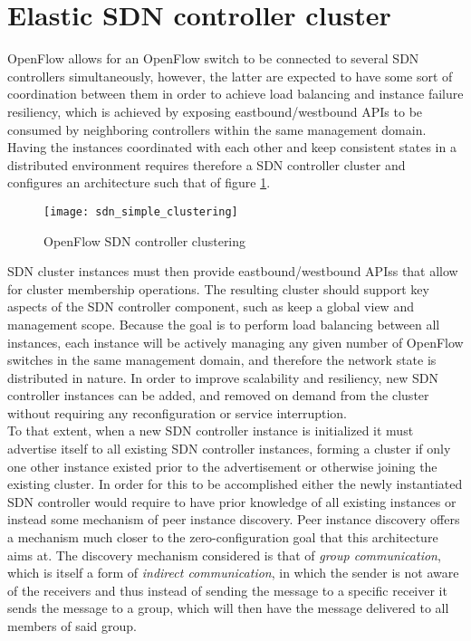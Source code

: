 \section{Elastic SDN controller cluster}
\label{section:SDN-controller-cluster}
OpenFlow allows for an OpenFlow switch to be connected to several \gls{SDN} controllers simultaneously, however, the latter are expected to have some sort of coordination between them in order to achieve load balancing and instance failure resiliency, which is achieved by exposing eastbound/westbound \glspl{API} to be consumed by neighboring controllers within the same management domain.
%
Having the instances coordinated with each other and keep consistent states in a distributed environment requires therefore a \gls{SDN} controller cluster and configures an architecture such that of figure \ref{fig:sdn_simple_clustering}.\\
%
\begin{figure}
	\centering
	\texttt{[image: sdn\_simple\_clustering]}
	\caption{OpenFlow SDN controller clustering}
	\label{fig:sdn_simple_clustering}
\end{figure}
%
\gls{SDN} cluster instances must then provide eastbound/westbound \glspl{API}s that allow for cluster membership operations.
The resulting cluster should support key aspects of the \gls{SDN} controller component, such as keep a global view and management scope.
Because the goal is to perform load balancing between all instances, each instance will be actively managing any given number of OpenFlow switches in the same management domain, and therefore the network state is distributed in nature.
In order to improve scalability and resiliency, new \gls{SDN} controller instances can be added, and removed on demand from the cluster without requiring any reconfiguration or service interruption.\\
%
To that extent, when a new \gls{SDN} controller instance is initialized it must advertise itself to all existing \gls{SDN} controller instances, forming a cluster if only one other instance existed prior to the advertisement or otherwise joining the existing cluster.
In order for this to be accomplished either the newly instantiated \gls{SDN} controller would require to have prior knowledge of all existing instances or instead some mechanism of peer instance discovery.
Peer instance discovery offers a mechanism much closer to the zero-configuration goal that this architecture aims at.
The discovery mechanism considered is that of \emph{group communication}, which is itself a form of \emph{indirect communication}, in which the sender is not aware of the receivers and thus instead of sending the message to a specific receiver it sends the message to a group, which will then have the message delivered to all members of said group\cite{PADI}.\\
